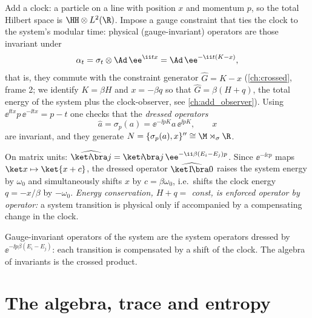 Add a clock: a particle on a line with position $x$ and momentum $p$, so the total Hilbert space is $\HH\otimes L^2(\R)$. Impose a gauge constraint that ties the clock to the system's modular time: physical (gauge-invariant) operators are those invariant under
\begin{equation}
\alpha_t=\sigma_t\otimes\Ad\,\ee^{\ii tx}=\Ad\,\ee^{-\ii t(K-x)},
\end{equation}
that is, they commute with the constraint generator $\hat G=K-x$ (\cref{ch:crossed}, frame 2; we identify $K=\beta H$ and $x=-\beta q$ so that $\hat G=\beta(H+q)$, the total energy of the system plus the clock-observer, see \cref{ch:add_observer}). Using $\ee^{\ii tx}p\,\ee^{-\ii tx}=p-t$ one checks that the \emph{dressed operators}
\begin{equation}
\hat a=\sigma_p(a)=\ee^{-\ii pK}a\,\ee^{\ii pK},\qquad x
\end{equation}
are invariant, and they generate $N=\{\sigma_p(a),x\}''\cong\M\rtimes_\sigma\R$.

On matrix units: $\widehat{\ket i\!\bra j}=\ket i\!\bra j\,\ee^{-\ii\beta(E_i-E_j)p}$. Since $\ee^{-\ii cp}$ maps $\ket x\mapsto\ket{x+c}$, the dressed operator $\widehat{\ket1\!\bra0}$ raises the system energy by $\omega_0$ and simultaneously shifts $x$ by $c=\beta\omega_0$, i.e.\ shifts the clock energy $q=-x/\beta$ by $-\omega_0$. \emph{Energy conservation, $H+q=$ const, is enforced operator by operator:} a system transition is physical only if accompanied by a compensating change in the clock.

\begin{keyidea}
Gauge-invariant operators of the system are the system operators dressed by $\ee^{-\ii p\beta(E_i-E_j)}$: each transition is compensated by a shift of the clock. The algebra of invariants is the crossed product.
\end{keyidea}

\section{The algebra, trace and entropy}


